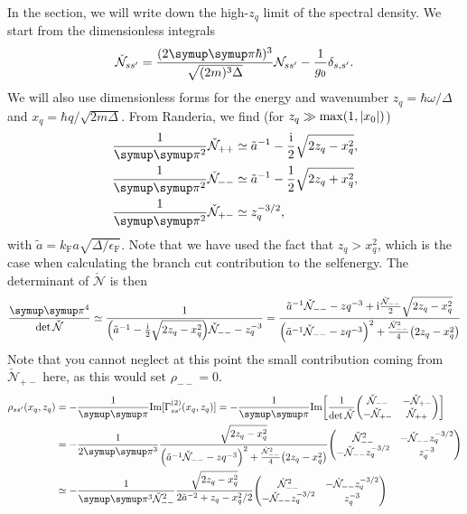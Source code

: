 \documentclass[10pt,a4paper]{article}
\let\canpi\pi
\renewcommand\pi{\symup\canpi}%
\newcommand{\ii}{\ensuremath{\mathrm{i}}}
\newcommand{\eF}{\ensuremath{\epsilon_\mathrm{F}}}
\newcommand{\kF}{\ensuremath{k_\mathrm{F}}}
\begin{document}
In the section, we will write down the high-$z_q$ limit of the spectral density. We start from the dimensionless integrals 
\begin{equation}
    \check{\mathcal{N}}_{ss^\prime} = \frac{(2\pi\hbar)^3}{\sqrt{(2m)^3\Delta}}
        \mathcal{N}_{ss^\prime} - \frac{1}{g_0} \delta_{s,s^\prime}.
\end{equation}
We will also use dimensionless forms for the energy and wavenumber $z_q = \hbar \omega/\Delta$ and $x_q= \hbar q/\sqrt{2m\Delta}$. From Randeria, we find (for $z_q \gg \max(1,\abs{x_0})$)
\begin{align}
    \frac{1}{\pi^2}\check{\mathcal{N}}_{++} &\simeq \tilde{a}^{-1} 
        - \frac{\ii}{2} \sqrt{2 z_q-x_q^2}, \\
    \frac{1}{\pi^2}\check{\mathcal{N}}_{--} &\simeq \tilde{a}^{-1} 
        - \frac{1}{2} \sqrt{2 z_q+x_q^2}, \\
    \frac{1}{\pi^2}\check{\mathcal{N}}_{+-} &\simeq z_q^{-3/2},
\end{align}
with $\tilde{a} = \kF a \sqrt{\Delta/\eF}$. Note that we have used the fact that $z_q>x_q^2$, which is the case when calculating the branch cut contribution to the selfenergy. The determinant of $\check{\mathcal{N}}$ is then
\begin{equation}
    \frac{\pi^4}{\det \check{\mathcal{N}}} \simeq \frac{1}{
    \qty( 
        \tilde{a}^{-1} - \frac{\ii}{2} \sqrt{2 z_q-x_q^2}
    )\check{\mathcal{N}}_{--} - z_q^{-3}} 
    = \frac{
        \tilde{a}^{-1} \check{\mathcal{N}}_{--} - zq^{-3} 
        + \ii \frac{\check{\mathcal{N}}_{--}}{2} \sqrt{2 z_q-x_q^2}
    }{
        \qty(\tilde{a}^{-1} \check{\mathcal{N}}_{--} - zq^{-3})^{2}
        + \frac{\check{\mathcal{N}}^2_{--}}{4} \qty(2 z_q-x_q^2)
    }
\end{equation}
Note that you cannot neglect at this point the small contribution coming from $\check{\mathcal{N}}_{+-}$ here, as this would set $\rho_{--}=0$.
\begin{align}
    \rho_{ss^\prime}(x_q,z_q) &= 
    -\frac{1}{\pi}\mathrm{Im}[\Gamma^{(2)}_{ss^\prime}(x_q,z_q)]
    = -\frac{1}{\pi}\mathrm{Im}\qty[
        \frac{1}{\det \check{\mathcal{N}}} \mqty(
            \check{\mathcal{N}}_{--} & -\check{\mathcal{N}}_{+-} \\
            -\check{\mathcal{N}}_{+-} & \check{\mathcal{N}}_{++}
        )] \\
    &=-\frac{1}{2\pi^3}\frac{ \sqrt{2 z_q-x_q^2} }{
        \qty(\tilde{a}^{-1} \check{\mathcal{N}}_{--} - zq^{-3})^{2}
        + \frac{\check{\mathcal{N}}^2_{--}}{4} \qty(2 z_q-x_q^2)
    } \mqty(
        \check{\mathcal{N}}^2_{--}  
            & -\check{\mathcal{N}}_{--} z_q^{-3/2}  \\
        -\check{\mathcal{N}}_{--} z_q^{-3/2}  
            & z_q^{-3}  
    ) \\
    &\simeq -\frac{1}{\pi^3\check{\mathcal{N}}^2_{--}}
    \frac{ \sqrt{2 z_q-x_q^2} }{
        2\tilde{a}^{-2} + z_q - x_q^2/2
    } \mqty(
        \check{\mathcal{N}}^2_{--}  
            & -\check{\mathcal{N}}_{--} z_q^{-3/2}  \\
        -\check{\mathcal{N}}_{--} z_q^{-3/2}  
            & z_q^{-3}  
    )
\end{align}
\end{document}
